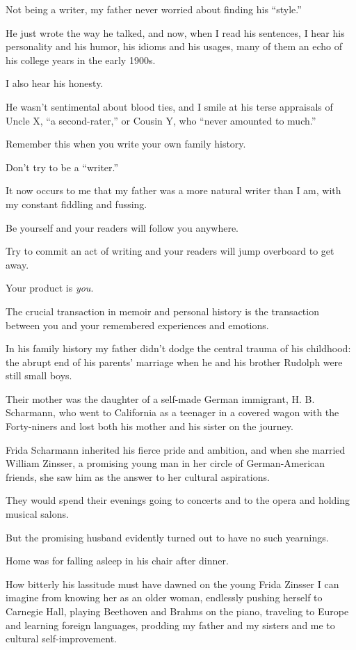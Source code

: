 \documentclass{book}
\numberwithin{equation}{section}
\begin{document}
Not being a writer, my father never worried about finding his ``style.''

He just wrote the way he talked, and now, when I read his sentences, I hear his personality and his humor, his idioms and his usages, many of them an echo of his college years in the early 1900s.

I also hear his honesty.

He wasn't sentimental about blood ties, and I smile at his terse appraisals of Uncle X, ``a second-rater,'' or Cousin Y, who ``never amounted to much.''

Remember this when you write your own family history.

Don't try to be a ``writer.''

It now occurs to me that my father was a more natural writer than I am, with my constant fiddling and fussing.

Be yourself and your readers will follow you anywhere.

Try to commit an act of writing and your readers will jump overboard to get away.

Your product is \textit{you}.

The crucial transaction in memoir and personal history is the transaction between you and your remembered experiences and emotions.

%
In his family history my father didn't dodge the central trauma of his childhood: the abrupt end of his parents' marriage when he and his brother Rudolph were still small boys.

Their mother was the daughter of a self-made German immigrant, H. B. Scharmann, who went to California as a teenager in a covered wagon with the Forty-niners and lost both his mother and his sister on the journey.

Frida Scharmann inherited his fierce pride and ambition, and when she married William Zinsser, a promising young man in her circle of German-American friends, she saw him as the answer to her cultural aspirations.

They would spend their evenings going to concerts and to the opera and holding musical salons.

But the promising husband evidently turned out to have no such yearnings.

Home was for falling asleep in his chair after dinner.

%
How bitterly his lassitude must have dawned on the young Frida Zinsser I can imagine from knowing her as an older woman, endlessly pushing herself to Carnegie Hall, playing Beethoven and Brahms on the piano, traveling to Europe and learning foreign languages, prodding my father and my sisters and me to cultural self-improvement.
\end{document}
